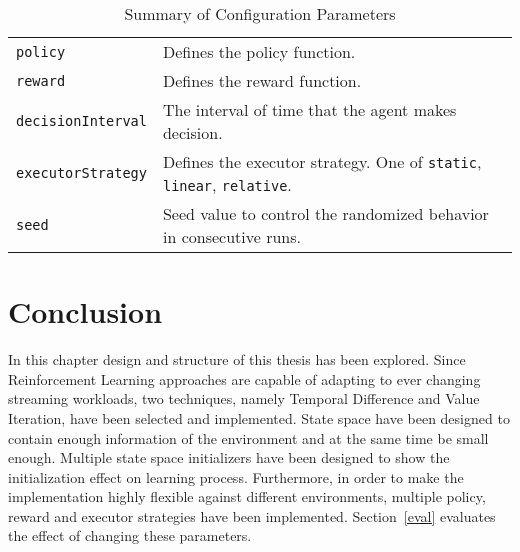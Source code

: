 \begin{table*}[h]
\begin{tabularx}{\textwidth}{lX}
        \lstinline|policy| & Defines the policy function.\\
        \lstinline|reward| & Defines the reward function.\\
        \lstinline|decisionInterval| & The interval of time that the agent makes decision. \\
        \lstinline|executorStrategy| & Defines the executor strategy. One of \lstinline|static|, \lstinline|linear|, \lstinline|relative|. \\
        \lstinline|seed| & Seed value to control the randomized behavior in consecutive runs.\\
        \bottomrule
    \end{tabularx}
    \centering
    \caption{Summary of Configuration Parameters}
    \label{des:tab:config}
\end{table*}

\section{Conclusion}
\label{des:conc}

In this chapter design and structure of this thesis has been explored. Since Reinforcement Learning approaches are capable of adapting to ever changing streaming workloads, two techniques, namely Temporal Difference and Value Iteration, have been selected and implemented. State space have been designed to contain enough information of the environment and at the same time be small enough. Multiple state space initializers have been designed to show the initialization effect on learning process. Furthermore, in order to make the implementation highly flexible against different environments, multiple policy, reward and executor strategies have been implemented. Section~\ref{eval} evaluates the effect of changing these parameters. 